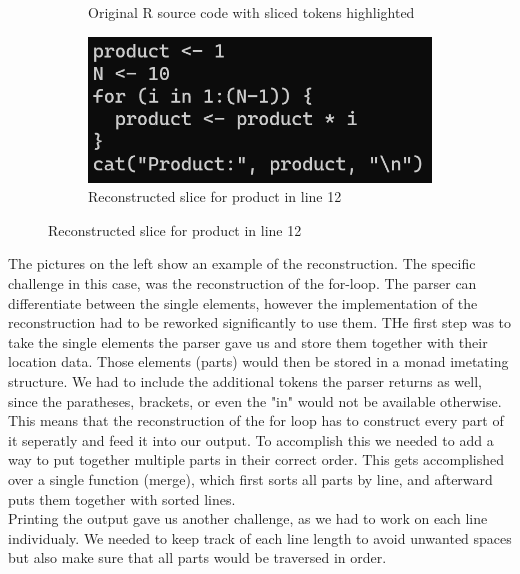 \documentclass[a3paper, portrait, english, default]{uulm-cs-poster}
\begin{document}
\begin{multicols}{2}
\begin{figure}
\begin{subfigure}[b]{0.2\textwidth}
			\caption{Original R source code with sliced tokens highlighted}
			\label{Fig.2}
		\end{subfigure}
		\begin{subfigure}[b]{0.2\textwidth}
			\includegraphics[scale=0.7]{Screenshot 2024-01-26 132150.png}
			\caption{Reconstructed slice for product in line 12}
			\label{Fig.3}
		\end{subfigure}
	\end{figure}
	The pictures on the left show an example of the reconstruction. The specific challenge in this case, was the reconstruction of the for-loop. The parser can differentiate between the single elements, however the implementation of the reconstruction had to be reworked significantly to use them. THe first step was to take the single elements the parser gave us and store them together with their location data. Those elements (parts) would then be stored in a monad imetating structure. We had to include the additional tokens the parser returns as well, since the paratheses, brackets, or even the "in" would not be available otherwise. This means that the reconstruction of the for loop has to construct every part of it seperatly and feed it into our output. To accomplish this we needed to add a way to put together multiple parts in their correct order. This gets accomplished over a single function (merge), which first sorts all parts by line, and afterward puts them together with sorted lines. \\
Printing the output gave us another challenge, as we had to work on each line individualy. We needed to keep track of each line length to avoid unwanted spaces but also make sure that all parts would be traversed in order.
\end{multicols}
\end{document}
